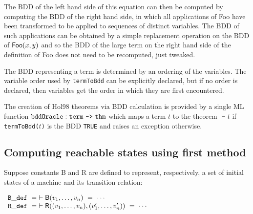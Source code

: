 \documentclass[12pt]{article}
\newcommand{\bnind}[1]{\index[MLbn]{#1}}
\newcommand{\con}[1]{\mbox{\sf #1}}
\newcommand{\ty}[1]{\mbox{\tt #1}}
\newcommand{\ml}[1]{{\tt #1}}
\newcommand\Hol{Hol98\xspace}
\newcommand\fun{\mbox{\tt{->}}}
\renewcommand{\prod}{\mbox{\tt{*}}}
\begin{document}
\smallskip

\noindent The BDD of the left hand side of this equation can then be
computed by computing the BDD of the right hand side, in which all
applications of \con{Foo} have been transformed to be applied to sequences of
distinct variables. The BDD of such applications can be obtained by a
simple replacement operation on the BDD of $\con{Foo}(x,y)$ and so the
BDD of the large term on the right hand side of the definition of
\con{Foo} does not need to be recomputed, just tweaked.

The BDD representing a term is determined by an ordering of the
variables.  The variable order used by \ml{termToBdd} can be
explicitly declared, but if no order is declared, then variables get the
order in which they are first encountered.

The creation of \Hol{} theorems via BDD calculation is provided
by a single ML function
$\ml{bddOracle} : \ty{term}~\fun~\ty{thm}$\bnind{\ml{bddOracle}}
which maps a term $t$ to the theorem $\vdash t$ if
\ml{termToBdd(}$t$\ml{)} is the BDD \ml{TRUE} and raises
an exception otherwise.

%
%
%
%
%

\subsection{Computing reachable states using first method}\label{reach1}

Suppose constants \con{B} and \con{R} are defined to represent,
respectively, a set of initial states of a machine and its transition
relation:

\smallskip

$\begin{array}{l}
\ml{B\_def}~=~\vdash \con{B}(v_1,\ldots,v_n)~=~\cdots\\
\ml{R\_def}~=~\vdash \con{R}((v_1,\ldots,v_n),(v'_1,\ldots,v'_n))~=~\cdots\\
\end{array}$
\end{document}
